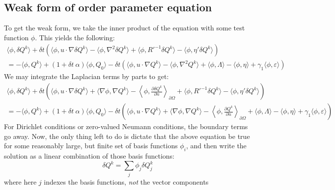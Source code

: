 \documentclass[reqno]{article}
\begin{document}
  \subsection{Weak form of order parameter equation}
  To get the weak form, we take the inner product of the equation with some test
  function $\phi$.
  This yields the following:
  \begin{multline}
    \langle \phi, \delta Q^k \rangle
    + \delta t \left(
      \langle \phi, u \cdot \nabla \delta Q^k \rangle 
      - \langle \phi, \nabla^2 \delta Q^k \rangle
      + \langle \phi, R'^{-1} \delta Q^k \rangle
      - \langle \phi, \eta' \delta Q^k \rangle  \right) \\
    =
    - \langle \phi, Q^k \rangle
    + (1 + \delta t \: \alpha) \langle \phi, Q_0 \rangle
    - \delta t \left(
      \langle \phi, u \cdot \nabla Q^k \rangle
      - \langle \phi, \nabla^2 Q^k \rangle
      + \langle \phi, \Lambda \rangle
      - \langle \phi, \eta \rangle
      + \gamma_1 \langle \phi, \varepsilon \rangle
    \right)
  \end{multline}
  We may integrate the Laplacian terms by parts to get:
  \begin{multline}
     \langle \phi, \delta Q^k \rangle
    + \delta t \left(
      \langle \phi, u \cdot \nabla \delta Q^k \rangle 
      + \langle \nabla \phi, \nabla Q^k \rangle
      - \left< \phi, \frac{\partial \delta Q^k}{\partial n} \right>_{\partial \Omega}
      + \langle \phi, R'^{-1} \delta Q^k \rangle
      - \langle \phi, \eta' \delta Q^k \rangle  \right) \\
    =
    - \langle \phi, Q^k \rangle
    + (1 + \delta t \: \alpha) \langle \phi, Q_0 \rangle
    - \delta t \left(
      \langle \phi, u \cdot \nabla Q^k \rangle
      + \langle \nabla \phi, \nabla Q^k \rangle
      - \left< \phi, \frac{\partial Q^k}{\partial n} \right>_{\partial \Omega}
      + \langle \phi, \Lambda \rangle
      - \langle \phi, \eta \rangle
      + \gamma_1 \langle \phi, \varepsilon \rangle
    \right)
  \end{multline}
  For Dirichlet conditions or zero-valued Neumann conditions, the boundary terms
  go away.
  Now, the only thing left to do is dictate that the above equation be true for
  some reasonably large, but finite set of basis functions $\phi_i$, and then
  write the solution as a linear combination of those basis functions:
  \begin{equation}
    \delta Q^k
    =
    \sum_j \phi_j \delta Q^k_j
  \end{equation}
  where here $j$ indexes the basis functions, \textit{not} the vector components
\end{document}
